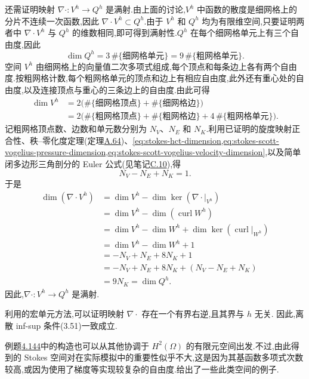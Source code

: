 \begin{example}
还需证明映射 $\nabla\cdot:V^h\to Q^h$ 是满射.由上面的讨论,$V^h$ 中函数的散度是细网格上的分片不连续一次函数,因此 $\nabla\cdot V^h\subset Q^h$.由于 $V^h$ 和 $Q^h$ 均为有限维空间,只要证明两者中 $\nabla\cdot V^h$ 与 $Q^h$ 的维数相同,即可得到满射性.$Q^h$ 在每个细网格单元上有三个自由度,因此
\begin{equation}\label{eq:stokes-scott-vogelius-pressure-dimension}
  \dim Q^h=3\,\#\{\text{细网格单元}\}
  =9\,\#\{\text{粗网格单元}\}.
\end{equation}
空间 $V^h$ 由细网格上的向量值二次多项式组成,每个顶点和每条边上各有两个自由度.按粗网格计数,每个粗网格单元的顶点和边上有相应自由度,此外还有重心处的自由度,以及连接顶点与重心的三条边上的自由度.由此可得
\begin{equation}\label{eq:stokes-scott-vogelius-velocity-dimension}
\begin{aligned}
  \dim V^h
  &=2\bigl(\#\{\text{细网格顶点}\}+\#\{\text{细网格边}\}\bigr)\\
  &=2\bigl(\#\{\text{粗网格顶点}\}+\#\{\text{粗网格边}\}
          +4\,\#\{\text{粗网格单元}\}\bigr).
\end{aligned}
\end{equation}
记粗网格顶点数、边数和单元数分别为 $N_V$、$N_E$ 和 $N_K$.利用已证明的旋度映射正合性、秩--零化度定理(定理\hyperref[thm:rank-nullity]{A.64})、\cref{eq:stokes-hct-dimension,eq:stokes-scott-vogelius-pressure-dimension,eq:stokes-scott-vogelius-velocity-dimension},以及简单闭多边形三角剖分的 Euler 公式(见笔记\hyperref[note:appendix-c-10]{C.10}),得
\[
  N_V-N_E+N_K=1.
\]
于是
\[
\begin{aligned}
  \dim(\nabla\cdot V^h)
  &=\dim V^h-\dim\ker(\nabla\cdot|_{V^h})\\
  &=\dim V^h-\dim(\operatorname{curl}W^h)\\
  &=\dim V^h-\dim W^h+\dim\ker(\operatorname{curl}|_{W^h})\\
  &=\dim V^h-\dim W^h+1\\
  &=-N_V+N_E+8N_K+1\\
  &=-N_V+N_E+8N_K+(N_V-N_E+N_K)\\
  &=9N_K=\dim Q^h.
\end{aligned}
\]
因此,$\nabla\cdot:V^h\to Q^h$ 是满射.

利用\textcite{ArnoldQin1992}的宏单元方法,可以证明映射 $\nabla\cdot$ 存在一个有界右逆,且其界与 $h$ 无关.
因此,离散 inf-sup 条件(3.51)一致成立.
\end{example}

\begin{note}[其他空间对]\label{note:stokes-other-subcomplex-pairs}
例题\hyperref[ex:barycentric-refinement-scott-vogelius]{4.144}中的构造也可以从其他协调于 $H^2(\Omega)$ 的有限元空间出发.不过,由此得到的 Stokes 空间对在实际模拟中的重要性似乎不大,这是因为其基函数多项式次数较高,或因为使用了梯度等实现较复杂的自由度.\textcite{FalkNeilan2013,GuzmanNeilan2014}给出了一些此类空间的例子.
\end{note}


